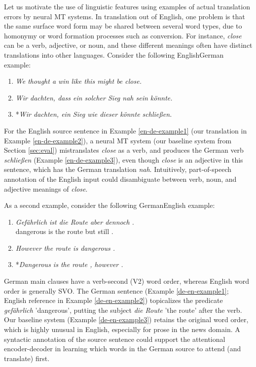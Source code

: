 \documentclass[11pt]{article}
\begin{document}
Let us motivate the use of linguistic features using examples of actual translation errors by neural MT systems.
In translation out of English, one problem is that the same surface word form may be shared between several word types,
due to homonymy or word formation processes such as conversion.
For instance, \emph{close} can be a verb, adjective, or noun, and these different meanings often have distinct translations into other languages.
Consider the following EnglishGerman example:

\begin{enumerate}[resume] \item \textit{We thought a win like this might be close.} \label{en-de-example1}
\item \textit{Wir dachten, dass ein solcher Sieg nah sein könnte.} \label{en-de-example2}
\item *\textit{Wir dachten, ein Sieg wie dieser könnte schließen.} \label{en-de-example3}
\end{enumerate}

For the English source sentence in Example \ref{en-de-example1} (our translation in Example \ref{en-de-example2}), a neural MT system (our baseline system from Section \ref{sec:eval}) mistranslates \emph{close} as a verb, and produces the German verb \emph{schließen} (Example \ref{en-de-example3}), even though \emph{close} is an adjective in this sentence, which has the German translation \emph{nah}.
Intuitively, part-of-speech annotation of the English input could disambiguate between verb, noun, and adjective meanings of \emph{close}.

As a second example, consider the following GermanEnglish example:

\begin{enumerate}[resume] \item \textit{Gefährlich ist die Route aber dennoch .}\\
dangerous is the route but still . \label{de-en-example1}
\item \textit{However the route is dangerous .} \label{de-en-example2}
\item *\textit{Dangerous is the route , however .} \label{de-en-example3}
\end{enumerate}

German main clauses have a verb-second (V2) word order, whereas English word order is generally SVO.
The German sentence (Example \ref{de-en-example1}; English reference in Example \ref{de-en-example2}) topicalizes the predicate \emph{gefährlich} 'dangerous', putting the subject \emph{die Route} 'the route' after the verb.
Our baseline system (Example \ref{de-en-example3}) retains the original word order, which is highly unusual in English, especially for prose in the news domain.
A syntactic annotation of the source sentence could support the attentional encoder-decoder in learning which words in the German source to attend (and translate) first.
\end{document}
